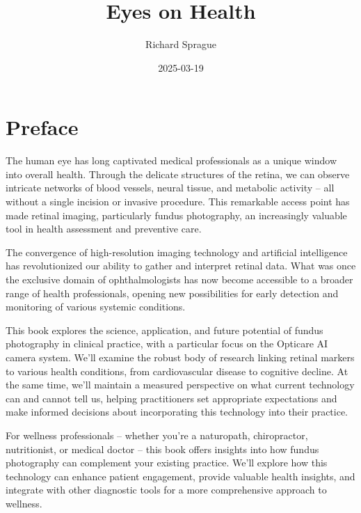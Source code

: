 \documentclass[
  Letterpaper,
]{scrbook}
\title{Eyes on Health}
\author{Richard Sprague}
\date{2025-03-19}
\renewcommand*\contentsname{Table of contents}
\newcommand\contentsname{Table of contents}
\begin{document}
\frontmatter
\maketitle

\renewcommand*\contentsname{Table of contents}
{
\setcounter{tocdepth}{1}
\tableofcontents
}

\mainmatter
{}

\chapter*{Preface}\label{preface}


The human eye has long captivated medical professionals as a unique
window into overall health. Through the delicate structures of the
retina, we can observe intricate networks of blood vessels, neural
tissue, and metabolic activity -- all without a single incision or
invasive procedure. This remarkable access point has made retinal
imaging, particularly fundus photography, an increasingly valuable tool
in health assessment and preventive care.

The convergence of high-resolution imaging technology and artificial
intelligence has revolutionized our ability to gather and interpret
retinal data. What was once the exclusive domain of ophthalmologists has
now become accessible to a broader range of health professionals,
opening new possibilities for early detection and monitoring of various
systemic conditions.

This book explores the science, application, and future potential of
fundus photography in clinical practice, with a particular focus on the
Opticare AI camera system. We'll examine the robust body of research
linking retinal markers to various health conditions, from
cardiovascular disease to cognitive decline. At the same time, we'll
maintain a measured perspective on what current technology can and
cannot tell us, helping practitioners set appropriate expectations and
make informed decisions about incorporating this technology into their
practice.

For wellness professionals -- whether you're a naturopath, chiropractor,
nutritionist, or medical doctor -- this book offers insights into how
fundus photography can complement your existing practice. We'll explore
how this technology can enhance patient engagement, provide valuable
health insights, and integrate with other diagnostic tools for a more
comprehensive approach to wellness.
\end{document}
